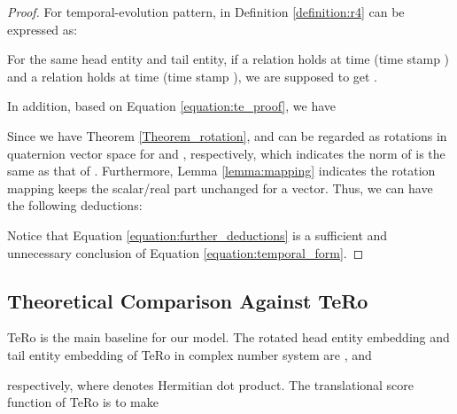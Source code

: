 \documentclass[11pt]{article}
\begin{document}
\begin{proof}

For temporal-evolution pattern,    in Definition \ref{definition:r4} can be expressed as:

For the same head entity and tail entity, if a relation  holds at time  (time stamp ) and a relation  holds at time  (time stamp ), we are supposed to get  . 

In addition, based on Equation \ref{equation:te_proof}, we have

Since we have Theorem \ref{Theorem_rotation},  and  can be regarded as rotations in quaternion vector space for  and , respectively, which indicates the norm of  is the same as that of . Furthermore, Lemma \ref{lemma:mapping} indicates the rotation mapping keeps the scalar/real part unchanged for a vector. Thus, we can have the following deductions:


Notice that Equation \ref{equation:further_deductions} is a sufficient and unnecessary conclusion of Equation \ref{equation:temporal_form}.
\end{proof}


\begin{table}[!t]
\centering
{}
\caption{Space complexity comparison of our RotateQVS with several baselines.}
\label{table:complexity}
\end{table}

\subsection{Theoretical Comparison Against TeRo}
\label{app:defect_TeRo}
TeRo \cite{xu2020tero} is the main baseline for our model.
The rotated head entity embedding and tail entity embedding of TeRo in complex number system are
, and

respectively, where  denotes Hermitian dot product. The translational score function of TeRo 
is to make
\end{document}
